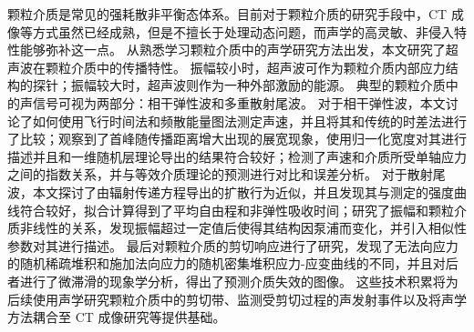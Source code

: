 颗粒介质是常见的强耗散非平衡态体系。目前对于颗粒介质的研究手段中，CT 成像等方式虽然已经成熟，但是不擅长于处理动态问题，而声学的高灵敏、非侵入特性能够弥补这一点。
  从熟悉学习颗粒介质中的声学研究方法出发，本文研究了超声波在颗粒介质中的传播特性。
  振幅较小时，超声波可作为颗粒介质内部应力结构的探针；振幅较大时，超声波则作为一种外部激励的能源。
  典型的颗粒介质中的声信号可视为两部分：相干弹性波和多重散射尾波。
  对于相干弹性波，本文讨论了如何使用飞行时间法和频散能量图法测定声速，并且将其和传统的时差法进行了比较；观察到了首峰随传播距离增大出现的展宽现象，使用归一化宽度对其进行描述并且和一维随机层理论导出的结果符合较好；检测了声速和介质所受单轴应力之间的指数关系，并与等效介质理论的预测进行对比和误差分析。
  对于散射尾波，本文探讨了由辐射传递方程导出的扩散行为近似，并且发现其与测定的强度曲线符合较好，拟合计算得到了平均自由程和非弹性吸收时间；研究了振幅和颗粒介质非线性的关系，发现振幅超过一定值后使得其结构因泵浦而变化，并引入相似性参数对其进行描述。
  最后对颗粒介质的剪切响应进行了研究，发现了无法向应力的随机稀疏堆积和施加法向应力的随机密集堆积应力-应变曲线的不同，并且对后者进行了微滞滑的现象学分析，得出了预测介质失效的图像。
  这些技术积累将为后续使用声学研究颗粒介质中的剪切带、监测受剪切过程的声发射事件以及将声学方法耦合至 CT 成像研究等提供基础。